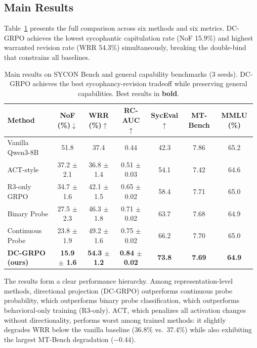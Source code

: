 \documentclass[11pt,a4paper]{article}
\begin{document}
\subsection{Main Results}
\label{sec:main_results}

Table~\ref{tab:main_results} presents the full comparison across six methods and six metrics. DC-GRPO achieves the lowest sycophantic capitulation rate (NoF 15.9\%) and highest warranted revision rate (WRR 54.3\%) simultaneously, breaking the double-bind that constrains all baselines.

\begin{table}[t]
\centering
\small
\begin{tabular}{lcccccc}
\toprule
\textbf{Method} & \textbf{NoF (\%)$\downarrow$} & \textbf{WRR (\%)$\uparrow$} & \textbf{RC-AUC$\uparrow$} & \textbf{SycEval$\uparrow$} & \textbf{MT-Bench} & \textbf{MMLU (\%)} \\
\midrule
Vanilla Qwen3-8B & 51.8 & 37.4 & 0.44 & 42.3 & 7.86 & 65.2 \\
ACT-style & 37.2 $\pm$ 2.1 & 36.8 $\pm$ 1.4 & 0.51 $\pm$ 0.03 & 54.1 & 7.42 & 64.6 \\
R3-only GRPO & 34.7 $\pm$ 1.6 & 42.1 $\pm$ 1.5 & 0.65 $\pm$ 0.02 & 58.4 & 7.71 & 65.0 \\
Binary Probe & 27.5 $\pm$ 2.3 & 46.3 $\pm$ 1.8 & 0.71 $\pm$ 0.02 & 63.7 & 7.68 & 64.9 \\
Continuous Probe & 23.8 $\pm$ 1.9 & 49.2 $\pm$ 1.6 & 0.75 $\pm$ 0.02 & 66.2 & 7.70 & 65.0 \\
\textbf{DC-GRPO (ours)} & \textbf{15.9 $\pm$ 1.6} & \textbf{54.3 $\pm$ 1.2} & \textbf{0.84 $\pm$ 0.02} & \textbf{73.8} & \textbf{7.69} & \textbf{64.9} \\
\bottomrule
\end{tabular}
\caption{Main results on SYCON Bench and general capability benchmarks (3 seeds). DC-GRPO achieves the best sycophancy-revision tradeoff while preserving general capabilities. Best results in \textbf{bold}.}
\label{tab:main_results}
\end{table}

The results form a clear performance hierarchy. Among representation-level methods, directional projection (DC-GRPO) outperforms continuous probe probability, which outperforms binary probe classification, which outperforms behavioral-only training (R3-only). ACT, which penalizes all activation changes without directionality, performs worst among trained methods: it slightly degrades WRR below the vanilla baseline (36.8\% vs.\ 37.4\%) while also exhibiting the largest MT-Bench degradation ($-0.44$).
\end{document}
